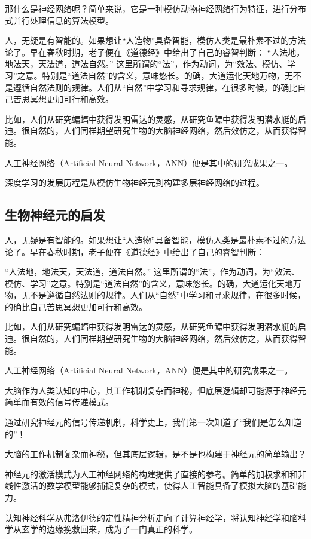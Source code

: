 那什么是神经网络呢？简单来说，它是一种模仿动物神经网络行为特征，进行分布式并行处理信息的算法模型。

人，无疑是有智能的。如果想让“人造物”具备智能，模仿人类是最朴素不过的方法论了。早在春秋时期，老子便在《道德经》中给出了自己的睿智判断：
“人法地，地法天，天法道，道法自然。”
这里所谓的“法”，作为动词，为“效法、模仿、学习”之意。特别是“道法自然”的含义，意味悠长。的确，大道运化天地万物，无不是遵循自然法则的规律。人们从“自然”中学习和寻求规律，在很多时候，的确比自己苦思冥想更加可行和高效。

比如，人们从研究蝙蝠中获得发明雷达的灵感，从研究鱼鳔中获得发明潜水艇的启迪。很自然的，人们同样期望研究生物的大脑神经网络，然后效仿之，从而获得智能。

人工神经网络（Artificial Neural Network，ANN）便是其中的研究成果之一。

深度学习的发展历程是从模仿生物神经元到构建多层神经网络的过程。

\subsection{生物神经元的启发}

人，无疑是有智能的。如果想让“人造物”具备智能，模仿人类是最朴素不过的方法论了。早在春秋时期，老子便在《道德经》中给出了自己的睿智判断：

“人法地，地法天，天法道，道法自然。”
这里所谓的“法”，作为动词，为“效法、模仿、学习”之意。特别是“道法自然”的含义，意味悠长。的确，大道运化天地万物，无不是遵循自然法则的规律。人们从“自然”中学习和寻求规律，在很多时候，的确比自己苦思冥想更加可行和高效。

比如，人们从研究蝙蝠中获得发明雷达的灵感，从研究鱼鳔中获得发明潜水艇的启迪。很自然的，人们同样期望研究生物的大脑神经网络，然后效仿之，从而获得智能。

人工神经网络（Artificial Neural Network，ANN）便是其中的研究成果之一。

大脑作为人类认知的中心，其工作机制复杂而神秘，但底层逻辑却可能源于神经元简单而有效的信号传递模式。

通过研究神经元的信号传递机制，科学史上，我们第一次知道了“我们是怎么知道的”！

大脑的工作机制复杂而神秘，但其底层逻辑，是不是也构建于神经元的简单输出？

神经元的激活模式为人工神经网络的构建提供了直接的参考。简单的加权求和和非线性激活的数学模型能够捕捉复杂的模式，使得人工智能具备了模拟大脑的基础能力。

认知神经科学从弗洛伊德的定性精神分析走向了计算神经学，将认知神经学和脑科学从玄学的边缘挽救回来，成为了一门真正的科学。

